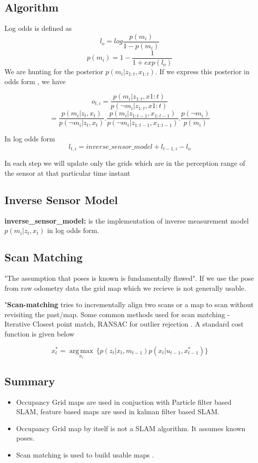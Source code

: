 \documentclass{article}
\begin{document}
\subsection{Algorithm}
Log odds is defined as $$l_o = log\frac{p(m_i)}{1 - p(m_i)}$$ 
$$ p(m_i) = 1 - \frac{1}{1+exp(l_o)}$$
We are hunting for the posterior $p(m_i|z_{1:t},x_{1:t})$. If we express this posterior in odds form , we have 

$$o_{t,i} = \frac{p(m_i|z_{1:t},x{1:t})}{p(\neg m_i | z_{1:t},x{1:t})}$$
$$= \frac{p(m_i|z_t,x_t)}{p(\neg m_i|z_t,x_t)} . \frac{p(m_i| z_{1:t-1},x_{1:t-1})}{p(\neg m_i| z_{1:t-1},x_{1:t-1})} . \frac{p(\neg m_i)}{p(m_i)}$$

In log odds form 
$$l_{t,i} = inverse\_sensor\_model + l_{t-1,i} - l_o$$

In each step we will update only the grids which are in the perception range of the sensor at that particular time instant 

\subsection{Inverse Sensor Model} 
\textbf{inverse\_sensor\_model:} is the implementation of inverse measurement model $p(m_i| z_t,x_t)$ in log odds form.

\subsection{Scan Matching}

"The assumption that poses is known is fundamentally flawed". If we use the pose from raw odometry data the grid map which we recieve is not generally usable. 

"\textbf{Scan-matching} tries to incrementally align two scans or a map to scan without revisiting the past/map. Some common methods used for scan matching - Iterative Closest point match, RANSAC for outlier rejection . A standard cost function is given below 

$${\displaystyle x_t^* = {\underset {x_t}{\operatorname {arg\,max} }}\,\{p(z_t|x_t,m_{t-1})p(x_t | u_{t-1},x_{t-1}^*)\}}$$

\subsection{Summary}
\begin{itemize}
    \item Occupancy Grid maps are used in conjuction with Particle filter based SLAM, feature based maps are used in kalman filter based SLAM.
    \item Occupancy Grid map by itself is not a SLAM algorithm. It assumes known poses. 
    \item Scan matching is used to build usable maps . 
\end{itemize}
\end{document}
